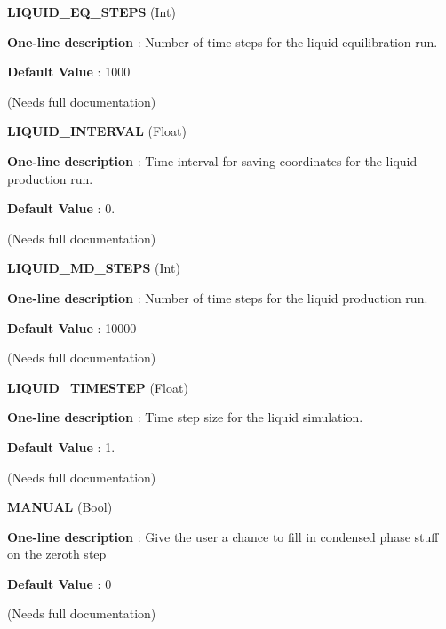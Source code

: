 \begin{DoxyItemize}
\item {\bfseries  L\-I\-Q\-U\-I\-D\-\_\-\-E\-Q\-\_\-\-S\-T\-E\-P\-S } (Int) \par
{\bfseries  One-\/line description }\-: Number of time steps for the liquid equilibration run. \par
{\bfseries  Default Value }\-: 1000 \par
(Needs full documentation)\end{DoxyItemize}
\begin{DoxyItemize}
\item {\bfseries  L\-I\-Q\-U\-I\-D\-\_\-\-I\-N\-T\-E\-R\-V\-A\-L } (Float) \par
{\bfseries  One-\/line description }\-: Time interval for saving coordinates for the liquid production run. \par
{\bfseries  Default Value }\-: 0. \par
(Needs full documentation)\end{DoxyItemize}
\begin{DoxyItemize}
\item {\bfseries  L\-I\-Q\-U\-I\-D\-\_\-\-M\-D\-\_\-\-S\-T\-E\-P\-S } (Int) \par
{\bfseries  One-\/line description }\-: Number of time steps for the liquid production run. \par
{\bfseries  Default Value }\-: 10000 \par
(Needs full documentation)\end{DoxyItemize}
\begin{DoxyItemize}
\item {\bfseries  L\-I\-Q\-U\-I\-D\-\_\-\-T\-I\-M\-E\-S\-T\-E\-P } (Float) \par
{\bfseries  One-\/line description }\-: Time step size for the liquid simulation. \par
{\bfseries  Default Value }\-: 1. \par
(Needs full documentation)\end{DoxyItemize}
\begin{DoxyItemize}
\item {\bfseries  M\-A\-N\-U\-A\-L } (Bool) \par
{\bfseries  One-\/line description }\-: Give the user a chance to fill in condensed phase stuff on the zeroth step \par
{\bfseries  Default Value }\-: 0 \par
(Needs full documentation)\end{DoxyItemize}
